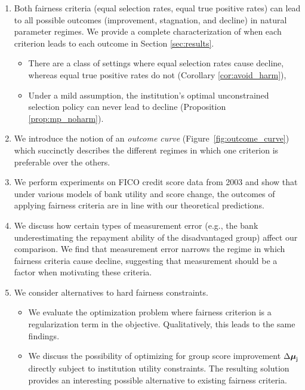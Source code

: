 \begin{enumerate} 
	\item Both fairness criteria (equal selection rates, equal true
	positive rates) can lead to all possible outcomes (improvement, stagnation, and decline) in natural parameter regimes.  We provide a complete characterization of when each criterion
	leads to each outcome in Section \ref{sec:results}.
	\begin{itemize}
		\item There are a class of settings where equal
		selection rates cause decline, whereas equal true positive rates do not (Corollary \ref{cor:avoid_harm}),
		\item Under a mild assumption, the institution's optimal unconstrained selection policy can never lead to decline (Proposition \ref{prop:mp_noharm}). 
	\end{itemize}

\item We introduce the notion of an \emph{outcome curve} (Figure~\ref{fig:outcome_curve}) which succinctly describes the different regimes in which one criterion is preferable over the others. 

\item We perform experiments on FICO credit score data from 2003 and show that under various models of bank utility and score change, the outcomes of applying fairness criteria are in line with our theoretical predictions.

\item
We discuss how certain types of measurement error (e.g., the bank
underestimating the repayment ability of the disadvantaged group) affect our
comparison. We find that measurement error narrows the regime in which fairness
criteria cause decline, suggesting that measurement should be a factor when
motivating these criteria.
\item We consider alternatives to hard fairness constraints.
\begin{itemize}
	\item We evaluate the optimization problem where fairness criterion is a regularization term in the objective. Qualitatively, this leads to the
	same findings.
	\item We discuss the possibility of optimizing for group score improvement $\Delta\boldsymbol{\mu}_{\mathsf{j}}$ directly subject to institution utility constraints. The
	resulting solution provides an interesting possible alternative to existing fairness criteria.
\end{itemize}

\end{enumerate}

